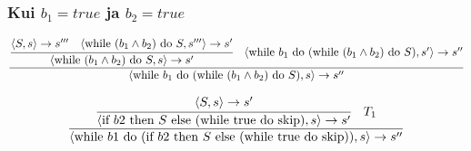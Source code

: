 \subsubsection{Kui \(b_1 = true\) ja \(b_2 = true\)}

\[
  \frac{
    \cfrac{
      \langle
      S, s
      \rangle \rightarrow s'''
      \quad
      \langle
      \text{while } (b_1 \wedge b_2) \text{ do } S, s'''
      \rangle \rightarrow s'
    }{
      \langle
      \text{while } (b_1 \wedge b_2) \text{ do } S, s
      \rangle \rightarrow s'
    }
    \quad
    \langle
    \text{while } b_1 \text{ do } (\text{while } (b_1 \wedge b_2) \text{ do } S), s'
    \rangle \rightarrow s''
  }{
    \langle
    \text{while } b_1 \text{ do } (\text{while } (b_1 \wedge b_2) \text{ do } S), s
    \rangle \rightarrow s''
  }
\] 


\[
  \frac{
    \cfrac{
      \langle
      S, s
      \rangle \rightarrow s'
    }{
      \langle
      \text{if } b2 \text{ then } S \text{ else }
      (\text{while true do skip})
      ,s
      \rangle
      \rightarrow s'
    }
    \quad
    T_1
  }{
    \langle
    \text{while } b1 \text{ do } (\text{if } b2 \text{ then } S \text{ else }
    (\text{while true do skip}))
    ,s
    \rangle \rightarrow s''
  }
\] 
